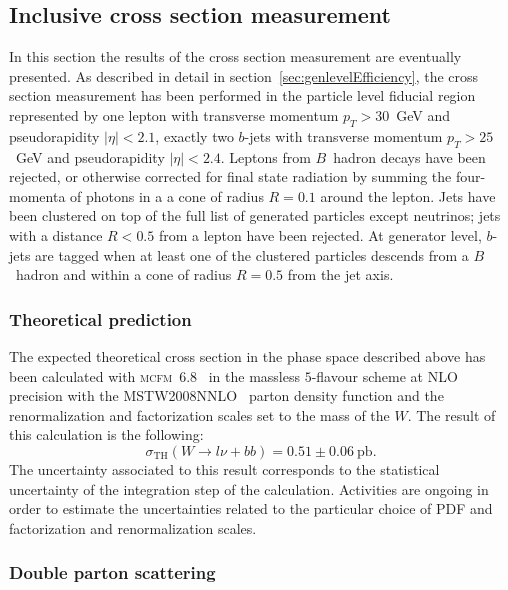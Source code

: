 \subsection{Inclusive cross section measurement}

In this section the results of the cross section measurement are 
eventually presented.
As described in detail in section~\ref{sec:genlevelEfficiency}, 
the cross section measurement has been performed in the particle level 
fiducial region represented by one lepton with transverse momentum 
$p_{T}>30$~GeV and pseudorapidity $|\eta|<2.1$, exactly two $b$-jets 
with transverse momentum $p_{T}>25$~GeV and pseudorapidity $|\eta|<2.4$.
Leptons from $B$~hadron decays have been rejected, or otherwise 
corrected for final state radiation by summing the four-momenta 
of photons in a a cone of radius $R=0.1$ around the lepton.
Jets have been clustered on top of the full list of generated particles 
except neutrinos; jets with a distance $R<0.5$ from a lepton have been 
rejected. At generator level, $b$-jets are tagged when at least one of the 
clustered particles descends from a $B$~hadron and within a cone of radius $R=0.5$
from the jet axis.

\subsubsection{Theoretical prediction}

The expected theoretical cross section in the phase space described above 
has been calculated with \textsc{mcfm~6.8}~\cite{mcfm}
in the massless $5$-flavour scheme at NLO precision 
with the \textsc{MSTW2008NNLO}~\cite{mstw2008} parton density function 
and the renormalization and factorization scales set to the mass of the $W$.
The result of this calculation is the following:
$$\sigma_{\mathrm{TH}} (W \rightarrow l \nu + bb) = 0.51 \pm 0.06~\mathrm{pb.}$$
The uncertainty associated to this result corresponds to the statistical uncertainty of 
the integration step of the calculation.
Activities are ongoing in order to estimate the uncertainties related to the 
particular choice of PDF and factorization and renormalization scales.

\subsubsection{Double parton scattering}

